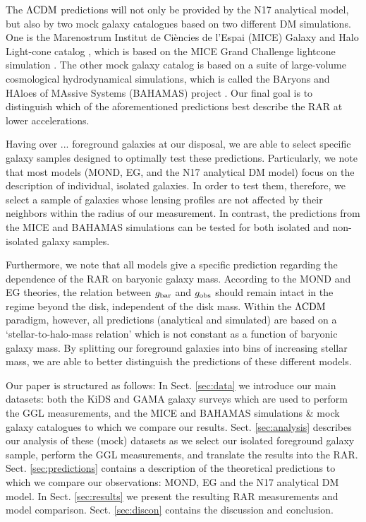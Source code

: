 \documentclass[usenatbib]{mnras}
\newcommand{\lcdm}{{\rm \Lambda CDM}}
\newcommand{\un}[1]{_{\rm #1}}
\begin{document}
The $\lcdm$ predictions will not only be provided by the N17 analytical model, but also by two mock galaxy catalogues based on two different DM simulations. One is the Marenostrum Institut de Ci{\`e}ncies de l'Espai (MICE) Galaxy and Halo Light-cone catalog \cite[]{carretero2015,hoffmann2015}, which is based on the MICE Grand Challenge lightcone simulation \cite[MICE-GC,][]{fosalba2015a,fosalba2015b,crocce2015}. The other mock galaxy catalog is based on a suite of large-volume cosmological hydrodynamical simulations, which is called the BAryons and HAloes of MAssive Systems (BAHAMAS) project \cite[]{mccarthy2017}. Our final goal is to distinguish which of the aforementioned predictions best describe the RAR at lower accelerations.

Having over ... foreground galaxies at our disposal, we are able to select specific galaxy samples designed to optimally test these predictions. Particularly, we note that most models (MOND, EG, and the N17 analytical DM model) focus on the description of individual, isolated galaxies. In order to test them, therefore, we select a sample of galaxies whose lensing profiles are not affected by their neighbors within the radius of our measurement. In contrast, the predictions from the MICE and BAHAMAS simulations can be tested for both isolated and non-isolated galaxy samples.

Furthermore, we note that all models give a specific prediction regarding the dependence of the RAR on baryonic galaxy mass. According to the MOND and EG theories, the relation between $g\un{bar}$ and $g\un{obs}$ should remain intact in the regime beyond the disk, independent of the disk mass. Within the $\lcdm$ paradigm, however, all predictions (analytical and simulated) are based on a `stellar-to-halo-mass relation' which is not constant as a function of baryonic galaxy mass. By splitting our foreground galaxies into bins of increasing stellar mass, we are able to better distinguish the predictions of these different models.

Our paper is structured as follows: In Sect. \ref{sec:data} we introduce our main datasets: both the KiDS and GAMA galaxy surveys which are used to perform the GGL measurements, and the MICE and BAHAMAS simulations \& mock galaxy catalogues to which we compare our results. Sect. \ref{sec:analysis} describes our analysis of these (mock) datasets as we select our isolated foreground galaxy sample, perform the GGL measurements, and translate the results into the RAR. Sect. \ref{sec:predictions} contains a description of the theoretical predictions to which we compare our observations: MOND, EG and the N17 analytical DM model. In Sect. \ref{sec:results} we present the resulting RAR measurements and model comparison. Sect. \ref{sec:discon} contains the discussion and conclusion.
\end{document}

